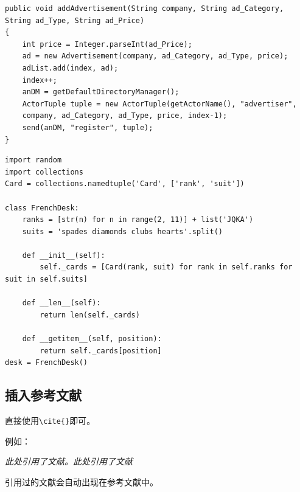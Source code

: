 \documentclass[12pt,hyperref,a4paper,UTF8]{ctexart}
\begin{document}
\begin{lstlisting}[style=Java, title="Java代码"]
public void addAdvertisement(String company, String ad_Category, String ad_Type, String ad_Price)
{
    int price = Integer.parseInt(ad_Price);
    ad = new Advertisement(company, ad_Category, ad_Type, price);
    adList.add(index, ad);
    index++;
    anDM = getDefaultDirectoryManager();
    ActorTuple tuple = new ActorTuple(getActorName(), "advertiser",
    company, ad_Category, ad_Type, price, index-1);
    send(anDM, "register", tuple);
}
\end{lstlisting}

\begin{lstlisting}[style=Python, title="Python代码"]                
import random
import collections
Card = collections.namedtuple('Card', ['rank', 'suit'])

class FrenchDesk:
    ranks = [str(n) for n in range(2, 11)] + list('JQKA')
    suits = 'spades diamonds clubs hearts'.split()
    
    def __init__(self):
        self._cards = [Card(rank, suit) for rank in self.ranks for suit in self.suits]
        
    def __len__(self):
        return len(self._cards)
        
    def __getitem__(self, position):
        return self._cards[position]
desk = FrenchDesk()
\end{lstlisting}

\subsection{插入参考文献}
直接使用\verb|\cite{}|即可\cite{DBLP:conf/nips/VaswaniSPUJGKP17}。

例如：


   \textit{ 此处引用了文献\cite{0Isaac}。此处引用了文献\cite{2016The}}


引用过的文献会自动出现在参考文献中。



\end{document}
